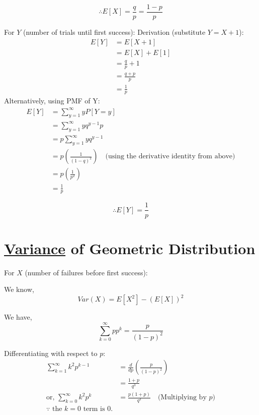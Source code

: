 \begin{equation}
  \label{eqn:expectation-geometric-X}
  \boxed{\therefore E[X] = \frac{q}{p} = \frac{1-p}{p}}
\end{equation}

For \(Y\) (number of trials until first success):
Derivation (substitute \(Y=X+1\)):
\begin{align*}
  E[Y] &= E[X+1] \\
       &= E[X] + E[1] \\
       &= \frac{q}{p} + 1 \\
       &= \frac{q+p}{p} \\
       &= \frac{1}{p}
\end{align*}
Alternatively, using PMF of Y:
\begin{align*}
  E[Y] &= \sum_{y=1}^{\infty} y P[Y=y] \\
       &= \sum_{y=1}^{\infty} y q^{y-1} p \\
       &= p \sum_{y=1}^{\infty} y q^{y-1} \\
       &= p \left( \frac{1}{(1-q)^2} \right) \quad \text{(using the derivative identity from above)} \\
       &= p \left( \frac{1}{p^2} \right) \\
       &= \frac{1}{p}
\end{align*}

\begin{equation}
  \label{eqn:expectation-geometric-Y}
  \boxed{\therefore E[Y] = \frac{1}{p}}
\end{equation}

\section{\href{def:variance-of-a-random-variable}{Variance} of Geometric Distribution}
\label{sec:variance-of-geometric-distribution} %

For \(X\) (number of failures before first success):

We know,\\
\[Var(X) = E[X^2] - (E[X])^2\]

We have,
\[\sum_{k=0}^{\infty} p p^k = \frac{p}{(1-p)^2}\]

Differentiating with respect to \(p\): 
\begin{align*}
  \sum_{k=1}^{\infty} k^2 p^{k-1} &= \frac{d}{dp} \left( \frac{p}{(1-p)^2}
  \right)\\ 
                                  &= \frac{1+p}{q^{3}}\\
    \text{or, } \sum_{k=0}^{\infty} k^2 p^k &= \frac{p(1+p)}{q^3}
    \quad \text{(Multiplying by \(p\))}\\
    \text{\(\because\) the \(k=0\) term is \(0\).}
  \end{align*}

